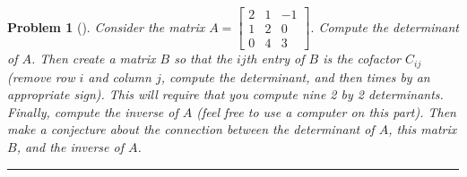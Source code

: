 \documentclass[letterpaper,oneside]{book}%
\theoremstyle{plain}
\theoremstyle{box}
\theoremstyle{problem}
\newtheorem{problemnum}{Problem}[chapter]
\newenvironment{problem}[1][]{\begin{problemnum}[#1]}{\end{problemnum}\nopagebreak\hrule\bigskip}
\begin{document}
\begin{problem}
 Consider the matrix
$A=\begin{bmatrix}
2&1&-1\\1&2&0\\0&4&3 
\end{bmatrix}.$
 Compute the determinant of $A$.  Then create a matrix $B$ so that the $ij$th entry of $B$ is the cofactor $C_{ij}$ (remove row $i$ and column $j$, compute the determinant, and then times by an appropriate sign).  This will require that you compute nine 2 by 2 determinants.  Finally, compute the inverse of $A$ (feel free to use a computer on this part). Then make a conjecture about the connection between the determinant of $A$, this matrix $B$, and the inverse of $A$.  
\end{problem}
\end{document}
